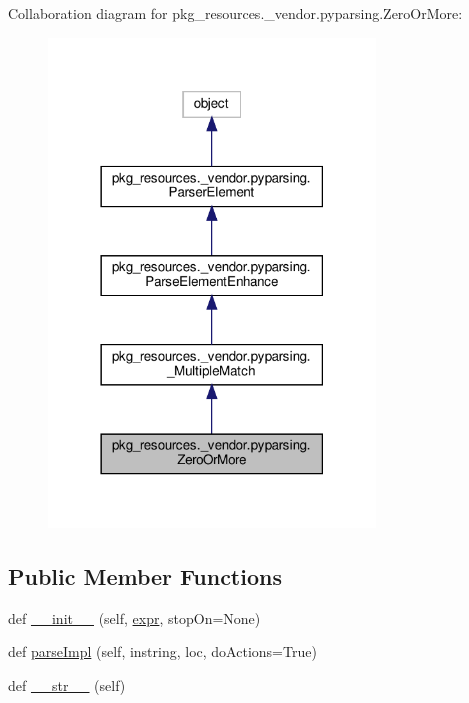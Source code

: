 Collaboration diagram for pkg\+\_\+resources.\+\_\+vendor.\+pyparsing.\+Zero\+Or\+More\+:
\nopagebreak
\begin{figure}[H]
\begin{center}
\leavevmode
\includegraphics[width=246pt]{classpkg__resources_1_1__vendor_1_1pyparsing_1_1ZeroOrMore__coll__graph}
\end{center}
\end{figure}
\subsection*{Public Member Functions}
\begin{DoxyCompactItemize}
\item 
def \hyperlink{classpkg__resources_1_1__vendor_1_1pyparsing_1_1ZeroOrMore_a07a9f74ce8d589b4f84b37c4b3ae2c41}{\+\_\+\+\_\+init\+\_\+\+\_\+} (self, \hyperlink{classpkg__resources_1_1__vendor_1_1pyparsing_1_1ParseElementEnhance_a34e02b3404b2a545ca1be8b522758896}{expr}, stop\+On=None)
\item 
def \hyperlink{classpkg__resources_1_1__vendor_1_1pyparsing_1_1ZeroOrMore_aa0f6130f0c3ccc8d0442ab136bd2a62b}{parse\+Impl} (self, instring, loc, do\+Actions=True)
\item 
def \hyperlink{classpkg__resources_1_1__vendor_1_1pyparsing_1_1ZeroOrMore_a0f970a46e2b6de5757ee987f49e53af7}{\+\_\+\+\_\+str\+\_\+\+\_\+} (self)
\end{DoxyCompactItemize}

